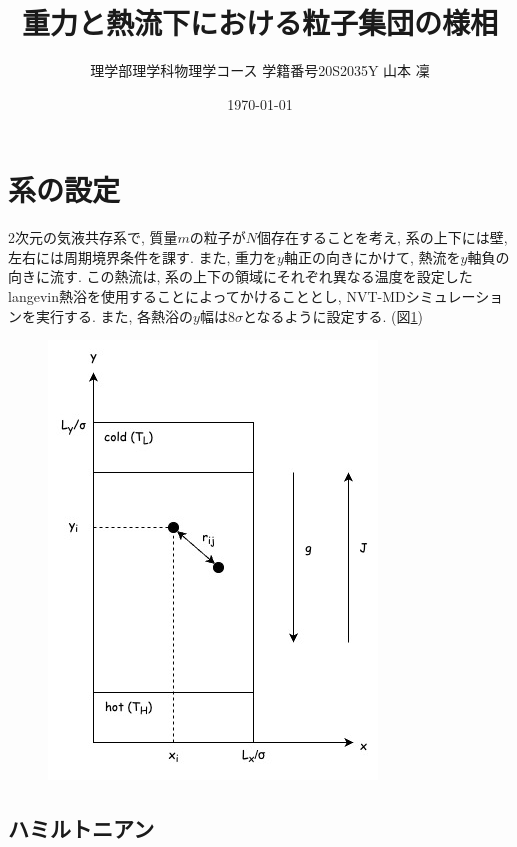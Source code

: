 \documentclass[dvipdfmx]{jsarticle}
\numberwithin{equation}{subsection}
\begin{document}
\title{重力と熱流下における粒子集団の様相}
\author{理学部理学科物理学コース 学籍番号20S2035Y 山本 凜}
\date{\today}
\maketitle
\newpage
\setcounter{tocdepth}{3}
\tableofcontents
\newpage

\section{系の設定}

2次元の気液共存系で, 質量$m$の粒子が$N$個存在することを考え, 系の上下には壁, 左右には周期境界条件を課す. また, 重力を$y$軸正の向きにかけて, 熱流を$y$軸負の向きに流す. この熱流は, 系の上下の領域にそれぞれ異なる温度を設定したlangevin熱浴を使用することによってかけることとし, NVT-MDシミュレーションを実行する. また, 各熱浴の$y$幅は$8\sigma$となるように設定する. (図\ref{fig:system})


\begin{figure}[H]
  \centering
  \caption{}
  \label{fig:system}
  \includegraphics[scale=0.7]{image/system.jpg}
\end{figure}

\subsection{ハミルトニアン}
\end{document}
